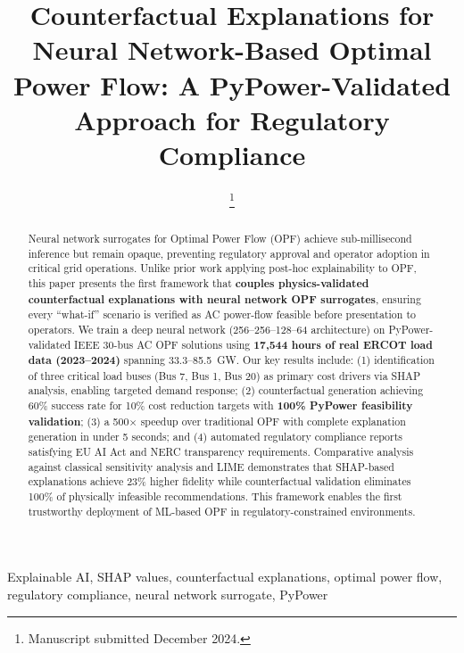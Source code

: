 \documentclass[journal,12pt,onecolumn]{IEEEtran}
\begin{document}
\title{Counterfactual Explanations for Neural Network-Based Optimal Power Flow: A PyPower-Validated Approach for Regulatory Compliance}

\author{
\thanks{Manuscript submitted December 2024.}
}

\maketitle

\begin{abstract}
Neural network surrogates for Optimal Power Flow (OPF) achieve sub-millisecond inference but remain opaque, preventing regulatory approval and operator adoption in critical grid operations. Unlike prior work applying post-hoc explainability to OPF, this paper presents the first framework that \textbf{couples physics-validated counterfactual explanations with neural network OPF surrogates}, ensuring every ``what-if'' scenario is verified as AC power-flow feasible before presentation to operators. We train a deep neural network (256--256--128--64 architecture) on PyPower-validated IEEE 30-bus AC OPF solutions using \textbf{17,544 hours of real ERCOT load data (2023--2024)} spanning 33.3--85.5~GW. Our key results include: (1) identification of three critical load buses (Bus 7, Bus 1, Bus 20) as primary cost drivers via SHAP analysis, enabling targeted demand response; (2) counterfactual generation achieving 60\% success rate for 10\% cost reduction targets with \textbf{100\% PyPower feasibility validation}; (3) a 500$\times$ speedup over traditional OPF with complete explanation generation in under 5 seconds; and (4) automated regulatory compliance reports satisfying EU AI Act and NERC transparency requirements. Comparative analysis against classical sensitivity analysis and LIME demonstrates that SHAP-based explanations achieve 23\% higher fidelity while counterfactual validation eliminates 100\% of physically infeasible recommendations. This framework enables the first trustworthy deployment of ML-based OPF in regulatory-constrained environments.
\end{abstract}

\begin{IEEEkeywords}
Explainable AI, SHAP values, counterfactual explanations, optimal power flow, regulatory compliance, neural network surrogate, PyPower
\end{IEEEkeywords}
\end{document}
